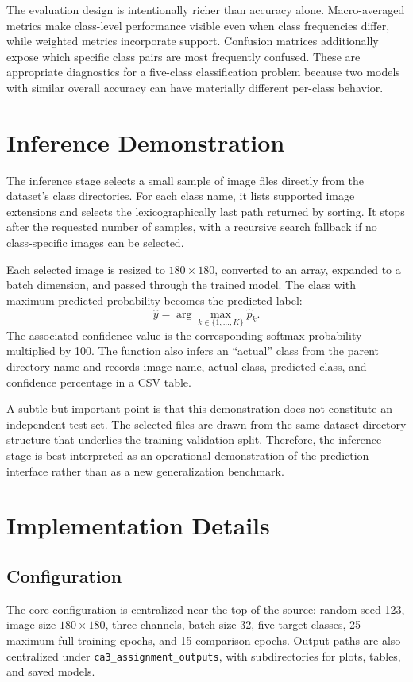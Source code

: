 \documentclass[11pt,a4paper]{article}
\newcommand{\code}[1]{\texttt{#1}}
\begin{document}
The evaluation design is intentionally richer than accuracy alone. Macro-averaged metrics make class-level performance visible even when class frequencies differ, while weighted metrics incorporate support. Confusion matrices additionally expose which specific class pairs are most frequently confused. These are appropriate diagnostics for a five-class classification problem because two models with similar overall accuracy can have materially different per-class behavior.

\section{Inference Demonstration}
The inference stage selects a small sample of image files directly from the dataset's class directories. For each class name, it lists supported image extensions and selects the lexicographically last path returned by sorting. It stops after the requested number of samples, with a recursive search fallback if no class-specific images can be selected.

Each selected image is resized to $180\times180$, converted to an array, expanded to a batch dimension, and passed through the trained model. The class with maximum predicted probability becomes the predicted label:
\begin{equation}
\hat{y}=\arg\max_{k\in\{1,\ldots,K\}}\hat{p}_k.
\end{equation}
The associated confidence value is the corresponding softmax probability multiplied by 100. The function also infers an ``actual'' class from the parent directory name and records image name, actual class, predicted class, and confidence percentage in a CSV table.

A subtle but important point is that this demonstration does not constitute an independent test set. The selected files are drawn from the same dataset directory structure that underlies the training-validation split. Therefore, the inference stage is best interpreted as an operational demonstration of the prediction interface rather than as a new generalization benchmark.

\section{Implementation Details}
\subsection{Configuration}
The core configuration is centralized near the top of the source: random seed 123, image size $180\times180$, three channels, batch size 32, five target classes, 25 maximum full-training epochs, and 15 comparison epochs. Output paths are also centralized under \code{ca3\_assignment\_outputs}, with subdirectories for plots, tables, and saved models.
\end{document}
